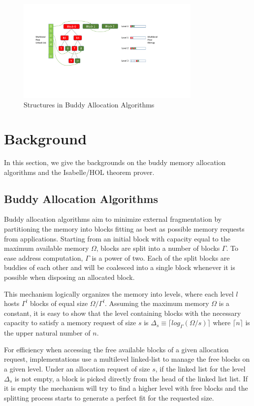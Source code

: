\begin{figure}[h]
	\centering
	\includegraphics[width=0.8\textwidth]{fig3.pdf}
	\caption{Structures in Buddy Allocation Algorithms}
	\label{fig3}
\end{figure} 
\section{Background}
In this section, we give the backgrounds on the buddy memory allocation algorithms and the Isabelle/HOL theorem prover.


\subsection{Buddy Allocation Algorithms}\label{sec:buddy}
Buddy allocation algorithms aim to minimize external fragmentation by partitioning the memory into blocks fitting as best as possible memory requests from applications. Starting from an initial block with capacity equal to the maximum available memory $\Omega$, blocks are split into a number of blocks $\Gamma$. To ease address computation, $\Gamma$ is a power of two. Each of the split blocks are buddies of each other and will be coalesced into a single block whenever it is possible when disposing an allocated block.

This mechanism logically organizes the memory into levels, where each level $l$ hosts $\Gamma^l$ blocks of equal size $\Omega/{\Gamma}^l$. Assuming the maximum memory $\Omega$ is a constant, it is easy to show that the level containing blocks with the necessary capacity to satisfy a memory request of size $s$ is $\Delta_s \equiv \lceil log_\Gamma (\Omega / s) \rceil$ where $\lceil n \rceil$ is the upper natural number of $n$.

For efficiency when accessing the free available blocks of a given allocation request, implementations use a multilevel linked-list to manage the free blocks on a given level. Under an allocation request of size $s$, if the linked list for the level $\Delta_s$ is not empty, a block is picked directly from the head of the linked list list. If it is empty the mechanism will try to find a higher level with free blocks and the splitting process starts to generate a perfect fit for the requested size. 

